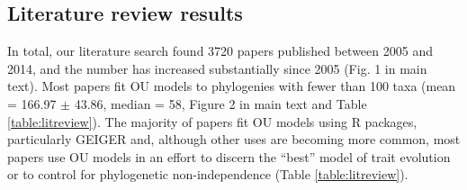 \documentclass[a4paper,12pt]{article}
\begin{document}
  \subsection{Literature review results}
    In total, our literature search found 3720 papers published between 2005 and 2014, and the number has increased substantially since 2005 (Fig. 1 in main text). 
    Most papers fit OU models to phylogenies with fewer than 100 taxa (mean = 166.97 $\pm$ 43.86, median = 58, Figure 2 in main text and Table \ref{table:litreview}). 
    The majority of papers fit OU models using R packages, particularly GEIGER and, although other uses are becoming more common, most papers use OU models in an effort to discern the ``best'' model of trait evolution or to control for phylogenetic non-independence (Table \ref{table:litreview}). 
\end{document}
